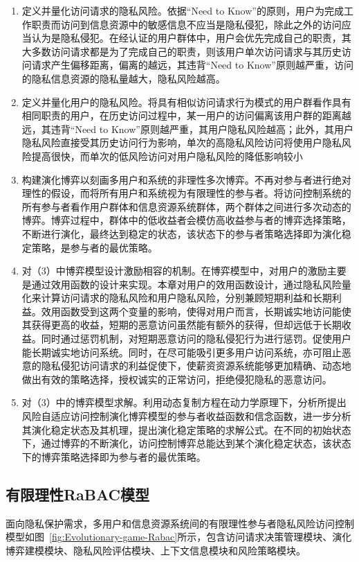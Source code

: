 \begin{enumerate}
	\item 定义并量化访问请求的隐私风险。依据“Need to Know”的原则，用户为完成工作职责而访问到信息资源中的敏感信息不应当是隐私侵犯，除此之外的访问应当认为是隐私侵犯。在经认证的用户群体中，用户会优先完成自己的职责，其大多数访问请求都是为了完成自己的职责，则该用户单次访问请求与其历史访问请求产生偏移距离，偏离的越远，其违背“Need to Know”原则越严重，访问的隐私信息资源的隐私量越大，隐私风险越高。
	\item 定义并量化用户的隐私风险。将具有相似访问请求行为模式的用户群看作具有相同职责的用户，在历史访问过程中，某一用户的访问偏离该用户群的距离越远，其违背“Need to Know”原则越严重，其用户隐私风险越高；此外，其用户隐私风险直接受其历史访问行为影响，单次的高隐私风险访问将使用户隐私风险提高很快，而单次的低风险访问对用户隐私风险的降低影响较小
	\item 构建演化博弈以刻画多用户和系统的非理性多次博弈。不再对参与者进行绝对理性的假设，而将所有用户和系统视为有限理性的参与者。将访问控制系统的所有参与者看作用户群体和信息资源系统群体，两个群体之间进行多次动态的博弈。博弈过程中，群体中的低收益者会模仿高收益参与者的博弈选择策略，不断进行演化，最终达到稳定的状态，该状态下的参与者策略选择即为演化稳定策略，是参与者的最优策略。
	\item 对（3）中博弈模型设计激励相容的机制。在博弈模型中，对用户的激励主要是通过效用函数的设计来实现。本章对用户的效用函数设计，通过隐私风险量化来计算访问请求的隐私风险和用户隐私风险，分别兼顾短期利益和长期利益。效用函数受到这两个变量的影响，使得对用户而言，长期诚实地访问能使其获得更高的收益，短期的恶意访问虽然能有额外的获得，但却远低于长期收益。同时通过惩罚机制，对短期恶意访问的隐私侵犯行为进行惩罚。促使用户能长期诚实地访问系统。同时，在尽可能吸引更多用户访问系统，亦可阻止恶意的隐私侵犯访问请求的利益促使下，使薪资资源系统能够更加精确、动态地做出有效的策略选择，授权诚实的正常访问，拒绝侵犯隐私的恶意访问。
	\item 对（3）中的博弈模型求解。利用动态复制方程在动力学原理下，分析所提出风险自适应访问控制演化博弈模型的参与者收益函数和信念函数，进一步分析其演化稳定状态及其机理，提出演化稳定策略的求解公式。在不同的初始状态下，通过博弈的不断演化，访问控制博弈总能达到某个演化稳定状态，该状态下的博弈策略选择即为参与者的最优策略。
\end{enumerate}

\subsection{有限理性RaBAC模型}
面向隐私保护需求，多用户和信息资源系统间的有限理性参与者隐私风险访问控制模型如图~\ref{fig:Evolutionary-game-Rabac}所示，包含访问请求决策管理模块、演化博弈建模模块、隐私风险评估模块、上下文信息模块和风险策略模块。

